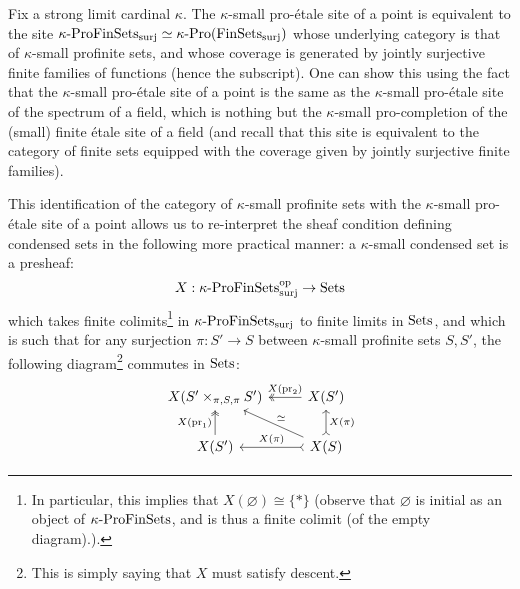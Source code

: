            \begin{remark} \label{remark: condensedness_and_profiniteness}
                Fix a strong limit cardinal $\kappa$. The $\kappa$-small pro-\'etale site of a point is equivalent to the site $\kappa\text{-}\mathrm{Pro}\mathrm{Fin}\mathrm{Sets}_{\mathrm{surj}} \simeq \kappa\text{-}\mathrm{Pro}(\mathrm{Fin}\mathrm{Sets}_{\mathrm{surj}})$ whose underlying category is that of $\kappa$-small profinite sets, and whose coverage is generated by jointly surjective finite families of functions (hence the subscript). One can show this using the fact that the $\kappa$-small pro-\'etale site of a point is the same as the $\kappa$-small pro-\'etale site of the spectrum of a field, which is nothing but the $\kappa$-small pro-completion of the (small) finite \'etale site of a field (and recall that this site is equivalent to the category of finite sets equipped with the coverage given by jointly surjective finite families). 
                
                This identification of the category of $\kappa$-small profinite sets with the $\kappa$-small pro-\'etale site of a point allows us to re-interpret the sheaf condition defining condensed sets in the following more practical manner: a $\kappa$-small condensed set is a presheaf:
                    $$X: \kappa\text{-}\mathrm{Pro}\mathrm{Fin}\mathrm{Sets}_{\mathrm{surj}}^{\mathrm{op}} \to \mathrm{Sets}$$
                which takes finite colimits\footnote{In particular, this implies that $X(\varnothing) \cong \{*\}$ (observe that $\varnothing$ is initial as an object of $\kappa\text{-}\mathrm{Pro}\mathrm{Fin}\mathrm{Sets}$, and is thus a finite colimit (of the empty diagram).).} in $\kappa\text{-}\mathrm{Pro}\mathrm{Fin}\mathrm{Sets}_{\mathrm{surj}}$ to finite limits in $\mathrm{Sets}$, and which is such that for any surjection $\pi: S' \to S$ between $\kappa$-small profinite sets $S, S'$, the following diagram\footnote{This is simply saying that $X$ must satisfy descent.} commutes in $\mathrm{Sets}$:
                    $$
                        \begin{tikzcd}
                            {X(S' \x_{\pi, S, \pi} S')} & {X(S')} \\
                            {X(S')} & {X(S)}
                            \arrow["{X(\pr_1)}", two heads, from=2-1, to=1-1]
                            \arrow["{X(\pi)}"', tail, from=2-2, to=2-1]
                            \arrow["{X(\pr_2)}"', two heads, from=1-2, to=1-1]
                            \arrow["{X(\pi)}"', tail, from=2-2, to=1-2]
                            \arrow["\cong"', from=2-2, to=1-1]
                        \end{tikzcd}
                    $$
            \end{remark}
            
